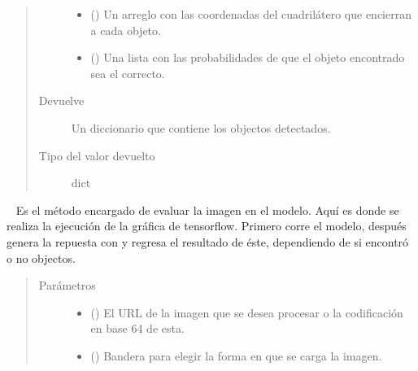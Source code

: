 \begin{fulllineitems}
\begin{fulllineitems}
\begin{quote}
\begin{description}
\begin{itemize}
\item {} 
 () \textendash{} Un arreglo con las coordenadas del cuadrilátero que encierran a cada objeto.

\item {} 
 () \textendash{} Una lista con las probabilidades de que el objeto encontrado sea el correcto.

\end{itemize}

\item[{Devuelve}] \leavevmode
Un diccionario  que contiene los objectos detectados.

\item[{Tipo del valor devuelto}] \leavevmode
dict

\end{description}\end{quote}

\end{fulllineitems}


\begin{fulllineitems}
\label{\detokenize{chapter_two/desc_cloudnao:app.tf_models.object_detection.ObjectDetectionTensorflow.object_detection}}~
Es el método encargado de evaluar la imagen en el modelo. Aquí es donde
se realiza la ejecución de la gráfica de tensorflow.
Primero corre el modelo, después genera la repuesta con {\hyperref[\detokenize{chapter_two/desc_cloudnao:app.tf_models.object_detection.ObjectDetectionTensorflow.create_response}]{}}
y regresa el resultado de éste, dependiendo de si encontró o no objectos.
\begin{quote}\begin{description}
\item[{Parámetros}] \leavevmode\begin{itemize}
\item {} 
 () \textendash{} El URL de la imagen que se desea procesar o la codificación en base 64 de esta.

\item {} 
 () \textendash{} Bandera para elegir la forma en que se carga la imagen.


\end{itemize}
\end{description}
\end{quote}
\end{fulllineitems}
\end{fulllineitems}
